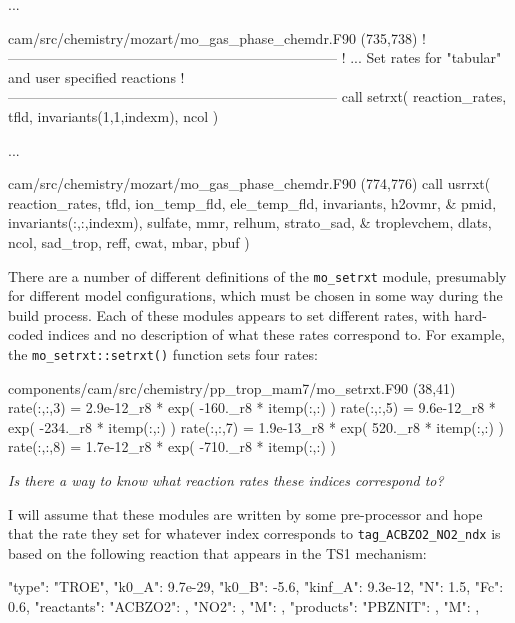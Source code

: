 \documentclass[titlepage]{article}
\begin{document}
\begin{blockcode}[commandchars=\\\{\}]
\color{gray}...

\color{gray}cam/src/chemistry/mozart/mo_gas_phase_chemdr.F90 (735,738)
    !-----------------------------------------------------------------------
    !       ...  Set rates for "tabular" and user specified reactions
    !-----------------------------------------------------------------------
    call setrxt( reaction_rates, tfld, invariants(1,1,indexm), ncol )

\color{gray}...

\color{gray}cam/src/chemistry/mozart/mo_gas_phase_chemdr.F90 (774,776)
    call usrrxt( reaction_rates, tfld, ion_temp_fld, ele_temp_fld, invariants, h2ovmr, &
                 pmid, invariants(:,:,indexm), sulfate, mmr, relhum, strato_sad, &
                 troplevchem, dlats, ncol, sad_trop, reff, cwat, mbar, pbuf )
\end{blockcode}

There are a number of different definitions of the \verb>mo_setrxt> module, presumably for different model configurations, which must be chosen in some way during the build process. Each of these modules appears to set different rates, with hard-coded indices and no description of what these rates correspond to. For example, the \verb>mo_setrxt::setrxt()> function sets four rates:

\begin{blockcode}[commandchars=\\\{\}]
\color{gray}components/cam/src/chemistry/pp_trop_mam7/mo_setrxt.F90 (38,41)
      rate(:,:,3) = 2.9e-12_r8 * exp( -160._r8 * itemp(:,:) )
      rate(:,:,5) = 9.6e-12_r8 * exp( -234._r8 * itemp(:,:) )
      rate(:,:,7) = 1.9e-13_r8 * exp( 520._r8 * itemp(:,:) )
      rate(:,:,8) = 1.7e-12_r8 * exp( -710._r8 * itemp(:,:) )
\end{blockcode}

\vspace{30px}
\noindent\textit{\Large Is there a way to know what reaction rates these indices correspond to?}
\vspace{30px}

I will assume that these modules are written by some pre-processor and hope that the rate they set for whatever index corresponds to \verb>tag_ACBZO2_NO2_ndx> is based on the following reaction that appears in the TS1 mechanism:

\begin{blockcode}
        {
          "type": "TROE",
          "k0_A": 9.7e-29,
          "k0_B": -5.6,
          "kinf_A": 9.3e-12,
          "N": 1.5,
          "Fc": 0.6,
          "reactants": {
            "ACBZO2": { },
            "NO2": { },
            "M": { }
          },
          "products": {
            "PBZNIT": { },
            "M": { }
          }
        },
\end{blockcode}
\end{document}
